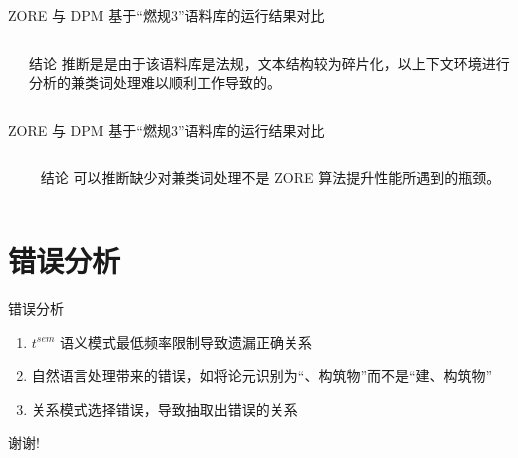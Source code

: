 \documentclass[12pt]{ctexbeamer}	%
\begin{document}
\begin{frame}{ZORE 与 DPM 基于“燃规3”语料库的运行结果对比}
  \begin{columns}
    \begin{column}{0.70\textwidth}
    \end{column}
    \begin{column}{0.30\textwidth}
      \begin{block}{结论}
        推断是是由于该语料库是法规，文本结构较为碎片化，以上下文环境进行分析的兼类词处理难以顺利工作导致的。
      \end{block}
    \end{column}
  \end{columns}
\end{frame}

\begin{frame}{ZORE 与 DPM 基于“燃规3”语料库的运行结果对比}
  \begin{columns}
    \begin{column}{0.70\textwidth}
    \end{column}
    \begin{column}{0.30\textwidth}
      \begin{block}{结论}
        可以推断缺少对兼类词处理不是 ZORE 算法提升性能所遇到的瓶颈。
      \end{block}
    \end{column}
  \end{columns}
\end{frame}


\section{错误分析}

\begin{frame}{错误分析}
  \begin{enumerate}
    \item $t^{sem}$ 语义模式最低频率限制导致遗漏正确关系
    \item 自然语言处理带来的错误，如将论元识别为“、构筑物”而不是“建、构筑物”
    \item 关系模式选择错误，导致抽取出错误的关系
  \end{enumerate}
\end{frame}



\begin{frame}
\centerline{\Large 谢谢!}
\end{frame}
\end{document}

